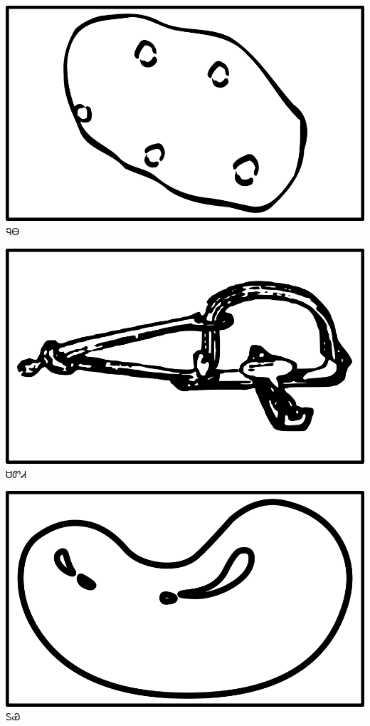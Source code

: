 \documentclass[avery5371]{flashcards}%
\begin{document}
\begin{flashcard}{
\includegraphics[width=0.95\columnwidth,height=.51\columnwidth,keepaspectratio]{../artwork/objects-neutral/nuna}
}\Huge ᏄᎾ
\end{flashcard}

\begin{flashcard}{
\includegraphics[width=0.95\columnwidth,height=.51\columnwidth,keepaspectratio]{../artwork/objects-neutral/sadvdi}
}\Huge ᏌᏛᏗ
\end{flashcard}

\begin{flashcard}{
\includegraphics[width=0.95\columnwidth,height=.51\columnwidth,keepaspectratio]{../artwork/objects-neutral/tuya}
}\Huge ᏚᏯ
\end{flashcard}
\end{document}
